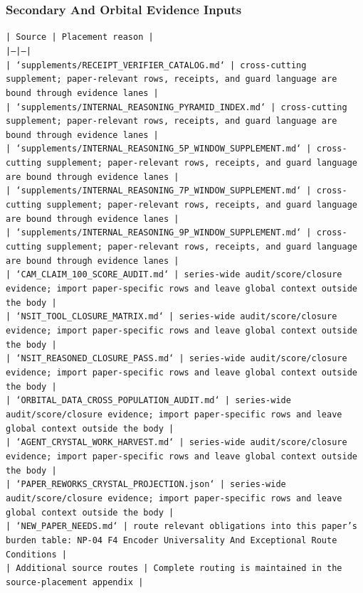 \documentclass[11pt]{article}
\begin{document}
\subsubsection*{Secondary And Orbital Evidence Inputs}

\noindent\texttt{| Source | Placement reason |}\\
\noindent\texttt{|---|---|}\\
\noindent\texttt{| `supplements/RECEIPT\_VERIFIER\_CATALOG.md` | cross-cutting supplement; paper-relevant rows, receipts, and guard language are bound through evidence lanes |}\\
\noindent\texttt{| `supplements/INTERNAL\_REASONING\_PYRAMID\_INDEX.md` | cross-cutting supplement; paper-relevant rows, receipts, and guard language are bound through evidence lanes |}\\
\noindent\texttt{| `supplements/INTERNAL\_REASONING\_5P\_WINDOW\_SUPPLEMENT.md` | cross-cutting supplement; paper-relevant rows, receipts, and guard language are bound through evidence lanes |}\\
\noindent\texttt{| `supplements/INTERNAL\_REASONING\_7P\_WINDOW\_SUPPLEMENT.md` | cross-cutting supplement; paper-relevant rows, receipts, and guard language are bound through evidence lanes |}\\
\noindent\texttt{| `supplements/INTERNAL\_REASONING\_9P\_WINDOW\_SUPPLEMENT.md` | cross-cutting supplement; paper-relevant rows, receipts, and guard language are bound through evidence lanes |}\\
\noindent\texttt{| `CAM\_CLAIM\_100\_SCORE\_AUDIT.md` | series-wide audit/score/closure evidence; import paper-specific rows and leave global context outside the body |}\\
\noindent\texttt{| `NSIT\_TOOL\_CLOSURE\_MATRIX.md` | series-wide audit/score/closure evidence; import paper-specific rows and leave global context outside the body |}\\
\noindent\texttt{| `NSIT\_REASONED\_CLOSURE\_PASS.md` | series-wide audit/score/closure evidence; import paper-specific rows and leave global context outside the body |}\\
\noindent\texttt{| `ORBITAL\_DATA\_CROSS\_POPULATION\_AUDIT.md` | series-wide audit/score/closure evidence; import paper-specific rows and leave global context outside the body |}\\
\noindent\texttt{| `AGENT\_CRYSTAL\_WORK\_HARVEST.md` | series-wide audit/score/closure evidence; import paper-specific rows and leave global context outside the body |}\\
\noindent\texttt{| `PAPER\_REWORKS\_CRYSTAL\_PROJECTION.json` | series-wide audit/score/closure evidence; import paper-specific rows and leave global context outside the body |}\\
\noindent\texttt{| `NEW\_PAPER\_NEEDS.md` | route relevant obligations into this paper's burden table: NP-04 F4 Encoder Universality And Exceptional Route Conditions |}\\
\noindent\texttt{| Additional source routes | Complete routing is maintained in the source-placement appendix |}\\
\end{document}
